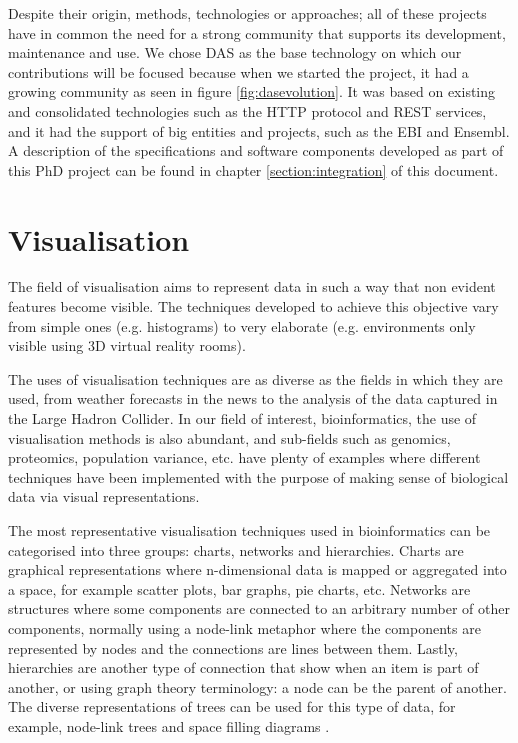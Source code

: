 Despite their origin, methods, technologies or approaches; all of these projects have in common the need for a strong community that supports its development, maintenance and use. We chose DAS as the base technology on which our contributions will be focused because when we started the project, it had a growing community as seen in figure \ref{fig:dasevolution}. It was based on existing and consolidated technologies such as the HTTP protocol and REST services, and it had the support of big entities and projects, such as the EBI and Ensembl. A description of the specifications and software components developed as part of this PhD project can be found in chapter \ref{section:integration} of this document.

\newpage


\section{Visualisation}

The field of visualisation aims to represent data in such a way that non evident features become visible. The techniques developed to achieve this objective vary from simple ones (e.g. histograms) to very elaborate (e.g. environments only visible using 3D virtual reality rooms).

The uses of visualisation techniques are as diverse as the fields in which they are used, from weather forecasts in the news to the analysis of the data captured in the Large Hadron Collider. In our field of interest, bioinformatics, the use of visualisation methods is also abundant, and sub-fields such as genomics, proteomics, population variance, etc. have plenty of examples where different techniques have been implemented with the purpose of making sense of biological data via visual representations.

The most representative visualisation techniques used in bioinformatics can be categorised into three groups: charts, networks and hierarchies. Charts are graphical representations where n-dimensional data is mapped or aggregated into a space, for example scatter plots, bar graphs, pie charts, etc. Networks are structures where some components are connected to an arbitrary number of other components, normally using a node-link metaphor where the components are represented by nodes and the connections are lines between them. Lastly, hierarchies are another type of connection that show when an item is part of another, or using graph theory terminology: a node can be the parent of another. The diverse representations of trees can be used for this type of data, for example, node-link trees and space filling diagrams \cite{WAN2014}. 

